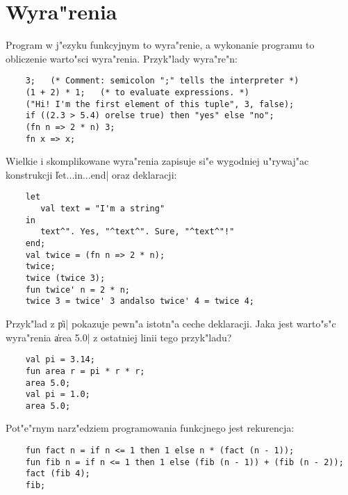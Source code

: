 \chapter{
Wyra"renia
}

Program w j"ezyku funkcyjnym to wyra"renie, 
a wykonanie programu to obliczenie warto"sci wyra"renia. Przyk"lady wyra"re"n:
\begin{verbatim}
    3;   (* Comment: semicolon ";" tells the interpreter *)
    (1 + 2) * 1;   (* to evaluate expressions. *)
    ("Hi! I'm the first element of this tuple", 3, false);
    if ((2.3 > 5.4) orelse true) then "yes" else "no";
    (fn n => 2 * n) 3;
    fn x => x;
\end{verbatim}
 
Wielkie i skomplikowane wyra"renia zapisuje si"e wygodniej 
u"rywaj"ac konstrukcji \|let...in...end| oraz deklaracji:
\begin{verbatim}
    let 
       val text = "I'm a string"
    in
       text^". Yes, "^text^". Sure, "^text^"!"
    end;
    val twice = (fn n => 2 * n);
    twice;
    twice (twice 3);
    fun twice' n = 2 * n;
    twice 3 = twice' 3 andalso twice' 4 = twice 4;
\end{verbatim}

Przyk"lad z \|pi| pokazuje pewn"a istotn"a ceche deklaracji.
Jaka jest warto"s"c wyra"renia \|area 5.0|
z ostatniej linii tego przyk"ladu?
\begin{verbatim}
    val pi = 3.14;
    fun area r = pi * r * r;
    area 5.0;
    val pi = 1.0;
    area 5.0;
\end{verbatim}

Pot"e"rnym narz"edziem programowania funkcjnego jest rekurencja:
\begin{verbatim}
    fun fact n = if n <= 1 then 1 else n * (fact (n - 1)); 
    fun fib n = if n <= 1 then 1 else (fib (n - 1)) + (fib (n - 2));
    fact (fib 4);
    fib;
\end{verbatim}

